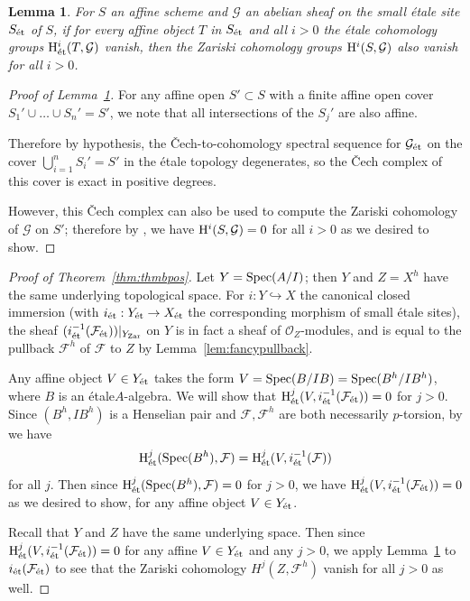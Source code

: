 \documentclass[12pt]{article}
\renewcommand{\O}{\mathscr{O}}
\newcommand{\F}{\mathcal{F}}
\newcommand{\G}{\mathcal{G}}
\newcommand{\spec}{{\rm Spec}}
\newcommand{\Et}{\'etale\xspace}
\newcommand{\et}{{\rm\acute{e}t}}
\newcommand{\zar}{{\rm Zar}}
\renewcommand{\H}{{\rm H}}
\newcommand{\spcite}[2]{\cite[\href{https://stacks.math.columbia.edu/tag/#1}{{#2} {#1}}]{stackp}}
\newtheorem{lemma}[theorem]{Lemma}
\theoremstyle{definition}
\numberwithin{equation}{subsection}
\begin{document}
\begin{lemma}\label{lem:thmblem} For $S$ an affine scheme and $\G$ an abelian sheaf on the small \Et site $S_{\et}$ of $S$, if for every affine object $T$ in $S_{\et}$ and all $i > 0$ the \Et cohomology groups $\H^i_{\et}(T,\G)$ vanish, then the Zariski cohomology groups $\H^i(S,\G)$ also vanish for all $i > 0$.
\end{lemma}\begin{proof}[Proof of Lemma~\ref{lem:thmblem}]
For any affine open $S' \subset S$ with a finite affine open cover $S_1' \cup \dots \cup S_n'= S'$, we note that all intersections of the $S_j'$ are also affine. 

Therefore by hypothesis, the \v{C}ech-to-cohomology spectral sequence for $\G_{\et}$ on the cover $\bigcup_{i=1}^n S_i'= S'$ in the \Et topology degenerates, so the \v{C}ech complex of this cover is exact in positive degrees. 

However, this \v{C}ech complex can also be used to compute the Zariski cohomology of $\G$ on $S'$; therefore by \spcite{01EW}{Lemma}, we have $\H^i(S,\G)=0$ for all $i > 0$ as we desired to show.\end{proof}



\begin{proof} [Proof of Theorem~\ref{thm:thmbpos}]

Let $Y=\spec(A/I)$; then $Y$ and $Z=X^h$ have the same underlying topological space. For $i: Y \hookrightarrow X$ the canonical closed immersion (with $i_{\et}: Y_{\et} \to X_{\et}$ the corresponding morphism of small \Et sites), the sheaf $(i_{\et}^{-1}(\F_{\et}))|_{Y_{\zar}}$ on $Y$ is in fact a sheaf of $\O_Z$-modules, and is equal to the pullback $\F^h$ of $\F$ to $Z$ by Lemma~\ref{lem:fancypullback}.

Any affine object $V \in Y_{\et}$ takes the form $V=\spec(B/IB)=\spec(B^h/IB^h)$, where $B$ is an \Et $A$-algebra. We will show that $\H^j_{\et}(V,i_{\et}^{-1}(\F_{\et}))=0$ for $j>0$. Since $(B^h,IB^h)$ is a Henselian pair and $\F,\F^h$ are both necessarily $p$-torsion, by \spcite{09ZI}{Theorem} we have $$\H^j_{\et}(\spec(B^h),\F) = \H^j_{\et}(V,i_{\et}^{-1}(\F))$$ for all $j$. Then since $\H^j_{\et}(\spec(B^h),\F)=0$ for $j > 0$, we have $\H^j_{\et}(V,i_{\et}^{-1}(\F_{\et}))=0$ as we desired to show, for any affine object $V \in Y_{\et}$. 



Recall that $Y$ and $Z$ have the same underlying space. Then since $\H^j_{\et}(V,i_{\et}^{-1}(\F_{\et}))=0$ for any affine $V \in Y_{\et}$ and any $j > 0$, we 
apply Lemma~\ref{lem:thmblem} to $i_{\et}(\F_{\et})$ to see that the Zariski cohomology $H^j(Z,\F^h)$ vanish for all $j > 0$ as well. \end{proof}
\end{document}
